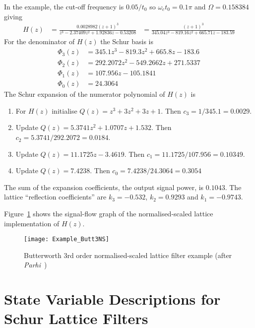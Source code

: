 \documentclass[a4paper,twoside,10pt,english]{report}
\begin{document}
In the example, the cut-off frequency is $0.05/t_{0}$ so $\omega_{c}t_{0}=0.1\pi$
and $\Omega=0.158384$ giving
\begin{align*}
H\left(z\right) & = \frac{0.0028982(z+1)^{3}}{z^{3}-2.37409z^{2}+1.92836z-0.53208}
     & = \frac{(z+1)^{3}}{345.04z^{3}-819.16z^{2}+665.71z-183.59}
\end{align*}
For the denominator of $H\left(z\right)$ the Schur basis is
\begin{align*}
\Phi_{3}\left(z\right) & = 345.1z^{3}-819.3z^{2}+665.8z-183.6\\
\Phi_{2}\left(z\right) & = 292.2072z^{2}-549.2662z+271.5337\\
\Phi_{1}\left(z\right) & = 107.956z-105.1841\\
\Phi_{0}\left(z\right) & = 24.3064
\end{align*}
The Schur expansion of the numerator polynomial of $H\left(z\right)$ is
\begin{enumerate}
\item For $H\left(z\right)$ initialise $Q\left(z\right)=z^{3}+3z^{2}+3z+1$. Then 
$c_{3}=1/345.1=0.0029$. 
\item Update $Q\left(z\right)=5.3741z^{2}+1.0707z+1.532$. Then 
$c_{2}=5.3741/292.2072=0.0184$.
\item Update $Q\left(z\right)=11.1725z-3.4619$. Then $c_{1}=11.1725/107.956=0.10349$.
\item Update $Q\left(z\right)=7.4238$. Then $c_{0}=7.4238/24.3064=0.3054$
\end{enumerate}
The sum of the expansion coefficients, the output signal power, is
$0.1043$. The lattice ``reflection coefficients'' are $k_{3}=-0.532$,
$k_{2}=0.9293$ and $k_{1}=-0.9743$.

Figure~\ref{fig:Butterworth-3rd-order} shows the signal-flow graph
of the normalised-scaled lattice implementation of $H\left(z\right)$. 

\begin{figure}[!htbp]
\begin{center}
\texttt{[image: Example\_Butt3NS]}
\caption{Butterworth 3rd order normalised-scaled lattice filter example (after 
\emph{Parhi}~\cite[Fig. 12.20]{Parhi_VLSIDigitalSignalProcessingSystems})}
\label{fig:Butterworth-3rd-order}
\end{center}
\end{figure}

\section{State Variable Descriptions for Schur Lattice Filters}
\end{document}
